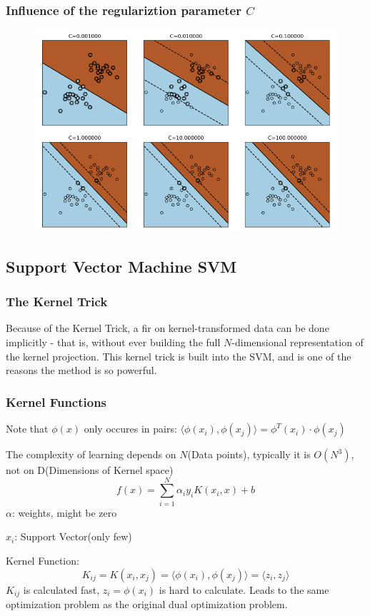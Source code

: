 \subsubsection*{Influence of the regulariztion parameter \(C\)}
\begin{figure}[!h]
    \includegraphics[width = \columnwidth]{figures/08/CExamples.png}
\end{figure}
\subsection{Support Vector Machine SVM}
\subsubsection{The Kernel Trick}
Because of the Kernel Trick, a fir on kernel-transformed data can be done implicitly - that is, without ever building the full \(N\)-dimensional representation of the kernel projection.
This kernel trick is built into the SVM, and is one of the reasons the method is so powerful.
\subsubsection{Kernel Functions}
Note that \(\phi(x)\) only occures in pairs: \(\langle \phi(x_i),\phi(x_j) \rangle = \phi^T(x_i)\cdot \phi(x_j)\)

The complexity of learning depends on \(N\)(Data points), typically it is \(O(N^3)\), not on D(Dimensions of Kernel space)
\[
f(x) = \sum_{i =1}^{N}\alpha_i y_i K(x_i,x) + b
\]
\(\alpha\): weights, might be zero

\(x_i\): Support Vector(only few)

Kernel Function:
\[
K_{ij} = K(x_i,x_j) = \langle \phi(x_i),\phi(x_j) \rangle = \langle z_i, z_j \rangle
\]
\(K_{ij}\) is calculated fast, \(z_i = \phi(x_i)\) is hard to calculate.
Leads to the same optimization problem as the original dual optimization problem.


